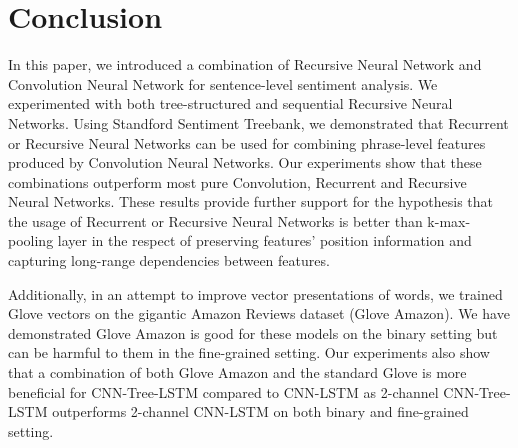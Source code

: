 \section{Conclusion}
In this paper, we introduced a combination of Recursive Neural Network and Convolution Neural Network for sentence-level sentiment analysis.
We experimented with both tree-structured and sequential Recursive Neural Networks.
Using Standford Sentiment Treebank, we demonstrated that Recurrent or Recursive Neural Networks can be used for combining phrase-level features produced by Convolution Neural Networks.
Our experiments show that these combinations outperform most pure Convolution, Recurrent and Recursive Neural Networks.
These results provide further support for the hypothesis that the usage of Recurrent or Recursive Neural Networks is better than k-max-pooling layer in the respect of preserving features' position information and capturing long-range dependencies between features.

Additionally, in an attempt to improve vector presentations of words, we trained Glove vectors on the gigantic Amazon Reviews dataset (Glove Amazon).
We have demonstrated Glove Amazon is good for these models on the binary setting but can be harmful to them in the fine-grained setting.
Our experiments also show that a combination of both Glove Amazon and the standard Glove is more beneficial for CNN-Tree-LSTM compared to CNN-LSTM as 2-channel CNN-Tree-LSTM outperforms 2-channel CNN-LSTM on both binary and fine-grained setting.


